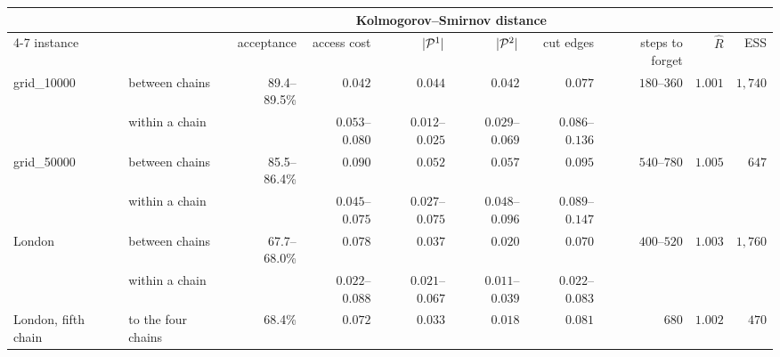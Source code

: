 \begin{tabular}{llrrrrrrrr}
\toprule
 & & & \multicolumn{4}{c}{Kolmogorov--Smirnov distance} & & & \\
\cmidrule(lr){4-7}
instance & & acceptance & access cost & $|\mathcal{P}^1|$ & $|\mathcal{P}^2|$ & cut edges & steps to forget & $\hat R$ & ESS \\
\midrule
grid\_10000 & between chains & 89.4--89.5\% & $0.042$ & $0.044$ & $0.042$ & $0.077$ & $180$--$360$ & $1.001$ & $1{,}740$ \\
 & within a chain & & $0.053$--$0.080$ & $0.012$--$0.025$ & $0.029$--$0.069$ & $0.086$--$0.136$ & & & \\
grid\_50000 & between chains & 85.5--86.4\% & $0.090$ & $0.052$ & $0.057$ & $0.095$ & $540$--$780$ & $1.005$ & $647$ \\
 & within a chain & & $0.045$--$0.075$ & $0.027$--$0.075$ & $0.048$--$0.096$ & $0.089$--$0.147$ & & & \\
London & between chains & 67.7--68.0\% & $0.078$ & $0.037$ & $0.020$ & $0.070$ & $400$--$520$ & $1.003$ & $1{,}760$ \\
 & within a chain & & $0.022$--$0.088$ & $0.021$--$0.067$ & $0.011$--$0.039$ & $0.022$--$0.083$ & & & \\
London, fifth chain & to the four chains & 68.4\% & $0.072$ & $0.033$ & $0.018$ & $0.081$ & $680$ & $1.002$ & $470$ \\
\bottomrule
\end{tabular}
